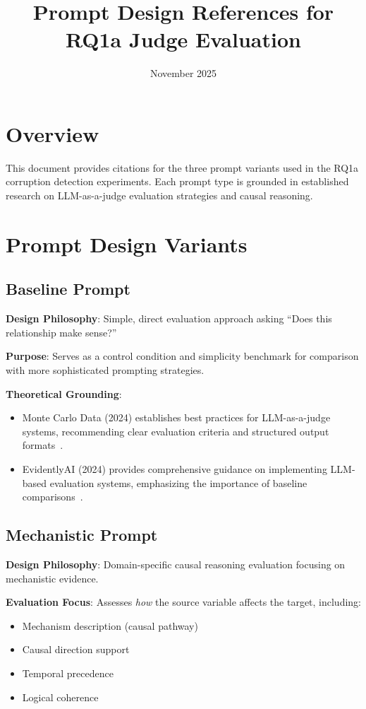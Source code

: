 \documentclass[11pt]{article}
\title{Prompt Design References for RQ1a Judge Evaluation}
\author{}
\date{November 2025}
\begin{document}
\maketitle

\section{Overview}

This document provides citations for the three prompt variants used in the RQ1a corruption detection experiments. Each prompt type is grounded in established research on LLM-as-a-judge evaluation strategies and causal reasoning.

\section{Prompt Design Variants}

\subsection{Baseline Prompt}

\textbf{Design Philosophy}: Simple, direct evaluation approach asking ``Does this relationship make sense?''

\textbf{Purpose}: Serves as a control condition and simplicity benchmark for comparison with more sophisticated prompting strategies.

\textbf{Theoretical Grounding}:
\begin{itemize}[noitemsep]
    \item Monte Carlo Data (2024) establishes best practices for LLM-as-a-judge systems, recommending clear evaluation criteria and structured output formats~\cite{montecarlo2024}.
    \item EvidentlyAI (2024) provides comprehensive guidance on implementing LLM-based evaluation systems, emphasizing the importance of baseline comparisons~\cite{evidentlyai2024}.
\end{itemize}

\subsection{Mechanistic Prompt}

\textbf{Design Philosophy}: Domain-specific causal reasoning evaluation focusing on mechanistic evidence.

\textbf{Evaluation Focus}: Assesses \textit{how} the source variable affects the target, including:
\begin{itemize}[noitemsep]
    \item Mechanism description (causal pathway)
    \item Causal direction support
    \item Temporal precedence
    \item Logical coherence
\end{itemize}
\end{document}
